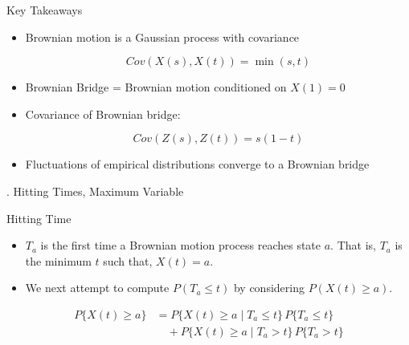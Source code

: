 \documentclass{beamer}
\begin{document}
	\begin{frame}{Key Takeaways}
		
		\begin{itemize}
			
			\item Brownian motion is a Gaussian process with covariance
			
			\[
			Cov(X(s),X(t)) = \min(s,t)
			\]
			
			\item Brownian Bridge = Brownian motion conditioned on $X(1)=0$
			
			\item Covariance of Brownian bridge:
			
			\[
			Cov(Z(s),Z(t)) = s(1-t)
			\]
			
			\item Fluctuations of empirical distributions converge to a Brownian bridge
			
		\end{itemize}
		
	\end{frame}

	\begin{frame}
	. Hitting Times, Maximum Variable
	\end{frame}
	
	\begin{frame}{Hitting Time}
		
		\begin{itemize}
			\item \(T_a\) is the first time a Brownian motion process reaches state $a$. That is, $T_a$ is the minimum $t$ such that, $X(t)=a$.
			\item We next attempt to compute $P(T_a\le t)$ by considering $P(X(t)\ge a)$.
		\end{itemize}
		
		\[
		\begin{aligned}
			P\{X(t)\ge a\}
			&=
			P\{X(t)\ge a \mid T_a \le t\}\,P\{T_a \le t\} \\
			&\quad + P\{X(t)\ge a \mid T_a > t\}\,P\{T_a > t\}
		\end{aligned}
		\]
		
	\end{frame}
	
\end{document}
